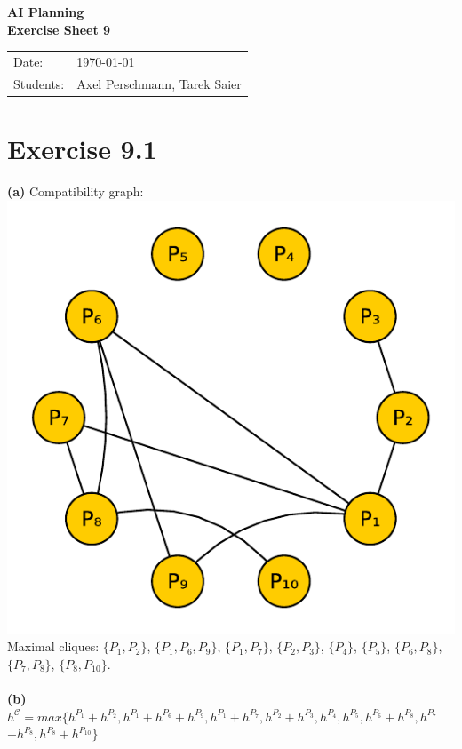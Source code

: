 \documentclass[11pt,a4paper]{article}
\newcommand{\sheetNr}{9}
\begin{document}
\begin{center}
\Huge{\textbf{AI Planning}}\\
\LARGE{\textbf{Exercise Sheet \sheetNr}}
\end{center}
\vspace{2cm}
\begin{tabular}{ll}
Date: & \today\\
Students: & Axel Perschmann, Tarek Saier
\end{tabular}

\section*{Exercise 9.1}
\textbf{(a)} Compatibility graph:\\
\includegraphics[scale=0.7]{compgraph}\\
Maximal cliques: $\{P_1,P_2\}$, $\{P_1,P_6,P_9\}$, $\{P_1,P_7\}$, $\{P_2,P_3\}$, $\{P_4\}$, $\{P_5\}$, $\{P_6,P_8\}$, $\{P_7,P_8\}$, $\{P_8,P_{10}\}$.\\
\\
\textbf{(b)}\\
$h^\mathscr{C}=max\{h^{P_1}+h^{P_2},h^{P_1}+h^{P_6}+h^{P_9},h^{P_1}+h^{P_7},h^{P_2}+h^{P_3},h^{P_4},h^{P_5},h^{P_6}+h^{P_8},h^{P_7}$\\
\hphantom{tabta}$+h^{P_8},h^{P_8}+h^{P_{10}}\}$\\
\end{document}
